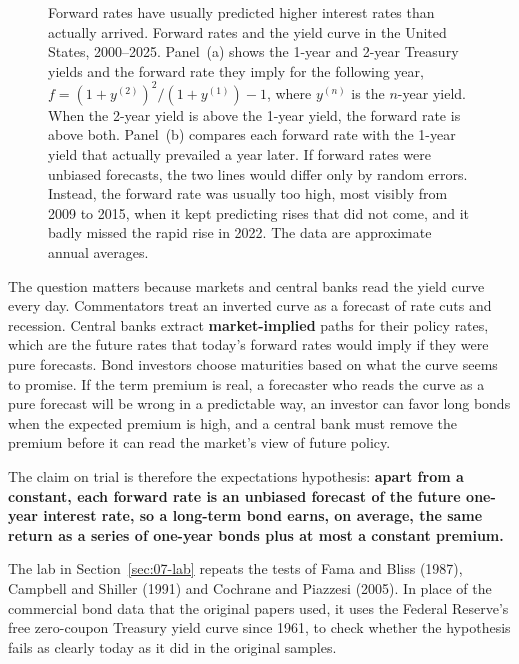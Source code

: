 \begin{figure}[htbp]
{%
}
\caption{Forward rates have usually predicted higher interest rates than actually arrived. Forward rates and the yield curve in the United States, 2000--2025. Panel~(a) shows the 1-year and 2-year Treasury yields and the forward rate they imply for the following year, $f = (1 + y^{(2)})^2 / (1 + y^{(1)}) - 1$, where $y^{(n)}$ is the $n$-year yield. When the 2-year yield is above the 1-year yield, the forward rate is above both. Panel~(b) compares each forward rate with the 1-year yield that actually prevailed a year later. If forward rates were unbiased forecasts, the two lines would differ only by random errors. Instead, the forward rate was usually too high, most visibly from 2009 to 2015, when it kept predicting rises that did not come, and it badly missed the rapid rise in 2022. The data are approximate annual averages.}
\label{fig:07-forward2}
\end{figure}



The question matters because markets and central banks read the yield curve every day. Commentators treat an inverted curve as a forecast of rate cuts and recession. Central banks extract \textbf{market-implied} paths for their policy rates, which are the future rates that today's forward rates would imply if they were pure forecasts. Bond investors choose maturities based on what the curve seems to promise. If the term premium is real, a forecaster who reads the curve as a pure forecast will be wrong in a predictable way, an investor can favor long bonds when the expected premium is high, and a central bank must remove the premium before it can read the market's view of future policy.

The claim on trial is therefore the expectations hypothesis: \textbf{apart from a constant, each forward rate is an unbiased forecast of the future one-year interest rate, so a long-term bond earns, on average, the same return as a series of one-year bonds plus at most a constant premium.}

The lab in Section~\ref{sec:07-lab} repeats the tests of Fama and Bliss (1987), Campbell and Shiller (1991) and Cochrane and Piazzesi (2005). In place of the commercial bond data that the original papers used, it uses the Federal Reserve's free zero-coupon Treasury yield curve since 1961, to check whether the hypothesis fails as clearly today as it did in the original samples.

